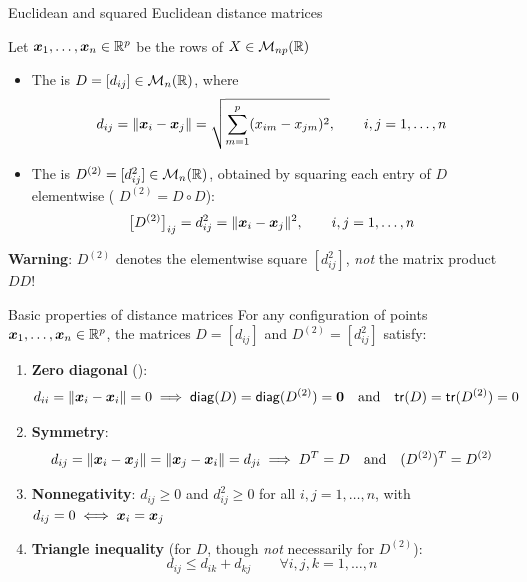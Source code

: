\documentclass[aspectratio=169]{beamer}\usepackage[]{graphicx}\usepackage[]{xcolor}
\begin{document}
\begin{frame}{Euclidean and squared Euclidean distance matrices}
\begin{importantdefinition}
Let $\bm{x}_1,\ldots,\bm{x}_n\in\mathbb{R}^p$ be the rows of $X\in\mathcal{M}_{np}(\mathbb{R})$
\vskip0.2cm
\begin{itemize}
\item The  is $D = [d_{ij}]\in\mathcal{M}_n(\mathbb{R})$, where
\[
d_{ij} = \|\bm{x}_i - \bm{x}_j\| = \sqrt{\sum_{m=1}^p (x_{im} - x_{jm})^2}, \qquad i,j=1,\ldots,n
\]
\item The  is $D^{(2)} = [d_{ij}^2]\in\mathcal{M}_n(\mathbb{R})$, obtained by squaring each entry of $D$ elementwise ( $D^{(2)} = D \circ D$):
\[
\big[D^{(2)}\big]_{ij} = d_{ij}^2 = \|\bm{x}_i - \bm{x}_j\|^2, \qquad i,j=1,\ldots,n
\]
\end{itemize}
\end{importantdefinition}
\vfill
\textbf{Warning}: $D^{(2)}$ denotes the elementwise square $[d_{ij}^2]$, \emph{not} the matrix product $DD$!
\end{frame}

\begin{frame}{Basic properties of distance matrices}
For any configuration of points $\bm{x}_1,\ldots,\bm{x}_n\in\mathbb{R}^p$, the matrices $D = [d_{ij}]$ and $D^{(2)} = [d_{ij}^2]$ satisfy:
\vfill
\begin{enumerate}
\item \textbf{Zero diagonal} ():
\[
d_{ii} = \|\bx_i - \bx_i\| = 0 \implies \diag(D) = \diag(D^{(2)}) = \b0 \quad\text{and}\quad \tr(D) = \tr(D^{(2)}) = 0
\]
\vfill
\item \textbf{Symmetry}:
\[
d_{ij} = \|\bm{x}_i - \bm{x}_j\| = \|\bm{x}_j - \bm{x}_i\| = d_{ji} \implies D^T = D \quad\text{and}\quad (D^{(2)})^T = D^{(2)}
\]
\vfill
\item \textbf{Nonnegativity}: $d_{ij} \ge 0$ and $d_{ij}^2 \ge 0$ for all $i,j=1,\ldots,n$, with $d_{ij} = 0 \iff \bm{x}_i = \bm{x}_j$
\vfill
\item \textbf{Triangle inequality} (for $D$, though \emph{not} necessarily for $D^{(2)}$):
\[
d_{ij} \le d_{ik} + d_{kj} \qquad \forall i,j,k=1,\ldots,n
\]
\end{enumerate}
\end{frame}
\end{document}

